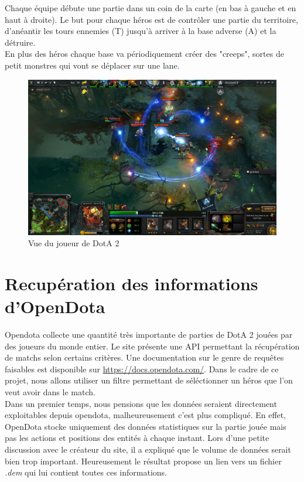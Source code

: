 \documentclass{article}
\begin{document}
Chaque équipe débute une partie dans un coin de la carte (en bas à gauche et en haut à droite). Le but pour chaque héros est de contrôler une partie du territoire, d'anéantir les tours ennemies (T) jusqu'à arriver à la base adverse (A) et la détruire.\\

En plus des héros chaque base va périodiquement créer des "creeps", sortes de petit monstres qui vont se déplacer sur une lane.
\begin{figure}[h]
\begin{center}
	\includegraphics[scale=0.25]{"dota2screen.png"} 
	\caption{Vue du joueur de DotA 2}
\end{center}
\end{figure}

\section{Recupération des informations d'OpenDota}

Opendota collecte une quantité très importante de parties de DotA 2 jouées par des joueurs du monde entier. Le site présente une API permettant la récupération de matchs selon certains critères. Une documentation sur le genre de requêtes faisables est disponible sur \url{https://docs.opendota.com/}. Dans le cadre de ce projet, nous allons utiliser un filtre permettant de séléctionner un héros que l'on veut avoir dans le match.\\
Dans un premier temps, nous pensions que les données seraient directement exploitables depuis opendota, malheureusement c'est plus compliqué. En effet, OpenDota stocke uniquement des données statistiques sur la partie jouée mais pas les actions et positions des entités à chaque instant. Lors d'une petite discussion avec le créateur du site, il a expliqué que le volume de données serait bien trop important. Heureusement le résultat propose un lien vers un fichier \textit{.dem} qui lui contient toutes ces informations.
\end{document}
